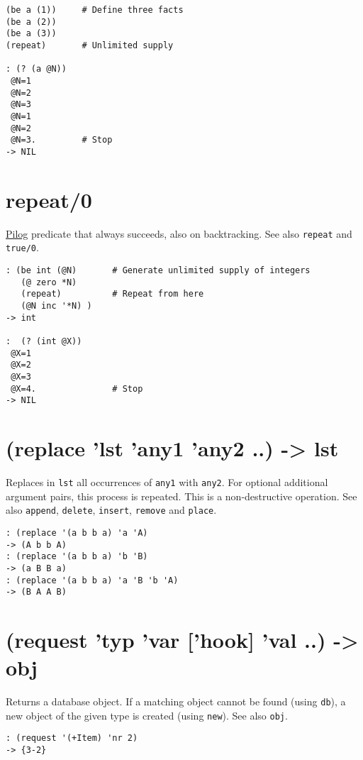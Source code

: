 {{{{{{{{\begin{verbatim}
(be a (1))     # Define three facts
(be a (2))
(be a (3))
(repeat)       # Unlimited supply

: (? (a @N))
 @N=1
 @N=2
 @N=3
 @N=1
 @N=2
 @N=3.         # Stop
-> NIL
\end{verbatim}

 
\section{repeat/0}
\label{sec-8-1-18-20}


\hyperref[ref.html-pilog]{Pilog} predicate that always succeeds, also on
backtracking. See also \texttt{repeat} and \texttt{true/0}.


\begin{verbatim}
: (be int (@N)       # Generate unlimited supply of integers
   (@ zero *N)
   (repeat)          # Repeat from here
   (@N inc '*N) )
-> int

:  (? (int @X))
 @X=1
 @X=2
 @X=3
 @X=4.               # Stop
-> NIL
\end{verbatim}

 
\section{(replace 'lst 'any1 'any2 ..) -> lst}
\label{sec-8-1-18-21}


Replaces in \texttt{lst} all occurrences of \texttt{any1} with \texttt{any2}. For optional
additional argument pairs, this process is repeated. This is a
non-destructive operation. See also \texttt{append}, \texttt{delete}, \texttt{insert},
\texttt{remove} and \texttt{place}.


\begin{verbatim}
: (replace '(a b b a) 'a 'A)
-> (A b b A)
: (replace '(a b b a) 'b 'B)
-> (a B B a)
: (replace '(a b b a) 'a 'B 'b 'A)
-> (B A A B)
\end{verbatim}

 
\section{(request 'typ 'var ['hook] 'val ..) -> obj}
\label{sec-8-1-18-22}


Returns a database object. If a matching object cannot be found (using
\texttt{db}), a new object of the given type is created (using \texttt{new}). See also
\texttt{obj}.


\begin{verbatim}
: (request '(+Item) 'nr 2)
-> {3-2}
\end{verbatim}

}}}}}}}}
